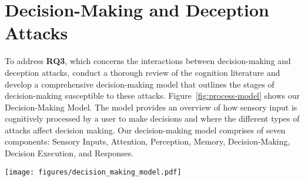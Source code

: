 \section{Decision-Making and Deception Attacks}
\label{sec:decision-making}

To address \textbf{RQ3}, which concerns the interactions between decision-making and \MR deception attacks,  conduct a thorough review of the cognition literature and develop a comprehensive decision-making model that outlines the stages of decision-making susceptible to these attacks.
Figure~\ref{fig:process-model} shows our \MR Decision-Making Model. The model provides an overview of how sensory input is cognitively processed by a user to make decisions and where the different types of attacks affect decision making.
Our decision-making model comprises of seven components: Sensory Inputs, Attention, Perception, Memory, Decision-Making, Decision Execution, and Responses.

\begin{figure*}[ht!]
\centering
  \texttt{[image: figures/decision\_making\_model.pdf]}
  \caption{\MR Deception Decision-Making Model. External stimuli (left) are input to cognitive processes (right). Stimuli are first processed by perception. %
  Selective attention manages perception on relevant stimuli. Organized stimuli are stored in working memory. Interpreted stimuli are passed to decision-making, where executive attention manages decisions and their execution.} %
  \label{fig:process-model}
 \vspace{-1ex}
\end{figure*}


